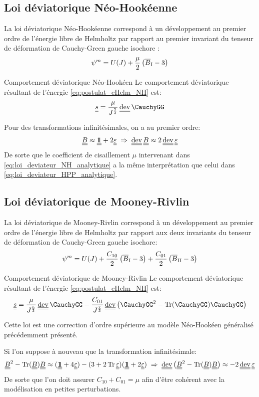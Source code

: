 \documentclass[10pt]{book}
\begin{document}
\subsection{Loi déviatorique Néo-Hookéenne}
La loi déviatorique Néo-Hookéenne correspond à un développement au premier ordre de l'énergie libre de Helmholtz par rapport au premier invariant du tenseur de déformation de Cauchy-Green gauche isochore \cite{bouteiller2023complete}:
\begin{equation}
\psi^{m} = U(J) + \dfrac{\mu}{2}\left(\overline{B}_{\mathrm{I}} -3\right)
\label{eq:postulat_eHelm_NH}
\end{equation}
\begin{Propo}{Comportement déviatorique Néo-Hookéen} Le comportement déviatorique résultant de l'énergie \eqref{eq:postulat_eHelm_NH} est:
\begin{equation}
\devia = \frac{\mu}{\J^{\frac{5}{3}}}\dev\CauchyGG
\label{eq:loi_deviateur_NH_analytique}
\end{equation}
\end{Propo}
Pour des transformations infinitésimales, on a au premier ordre:
$$\CGG \approx \TenUnit + 2\DefoHPP \implique \dev\CGG \approx 2\dev\DefoHPP$$
De sorte que le coefficient de cisaillement $\mu$ intervenant dans \eqref{eq:loi_deviateur_NH_analytique} a la même interprétation que celui dans \eqref{eq:loi_deviateur_HPP_analytique}.
\subsection{Loi déviatorique de Mooney-Rivlin}
La loi déviatorique de Mooney-Rivlin correspond à un développement au premier ordre de l'énergie libre de Helmholtz par rapport aux deux invariants du tenseur de déformation de Cauchy-Green gauche isochore:
\begin{equation}
\psi^{m} = U(J) + \dfrac{C_{10}}{2}\left(\overline{B}_{\mathrm{I}} -3\right)+ \dfrac{C_{01}}{2}\left(\overline{B}_{\mathrm{II}} -3\right)
\label{eq:postulat_eHelm_NH}
\end{equation}
\begin{Propo}{Comportement déviatorique de Mooney-Rivlin} Le comportement déviatorique résultant de l'énergie \eqref{eq:postulat_eHelm_NH} est:
$$\devia=\dfrac{\mu}{\J^{\frac{5}{3}}}\dev\CauchyGG-\dfrac{C_{01}}{\J^\frac{7}{3}}\dev\left(\CauchyGG^{2}-\tr(\CauchyGG)\CauchyGG\right)$$
\end{Propo}
Cette loi est une correction d'ordre supérieure au modèle Néo-Hookéen généralisé précédemment présenté. 

Si l'on suppose à nouveau que la transformation infinitésimale:
$$\CGG^{2}-\tr(\CGG)\CGG\approx (\TenUnit+4\DefoHPP) - (3+2\tr\DefoHPP)(\TenUnit+2\DefoHPP) \implique \dev\left(\CGG^{2}-\tr(\CGG)\CGG\right)\approx -2\dev\DefoHPP$$
De sorte que l'on doit assurer $C_{10}+C_{01}=\mu$ afin d'être cohérent avec la modélisation en petites perturbations.
\end{document}
